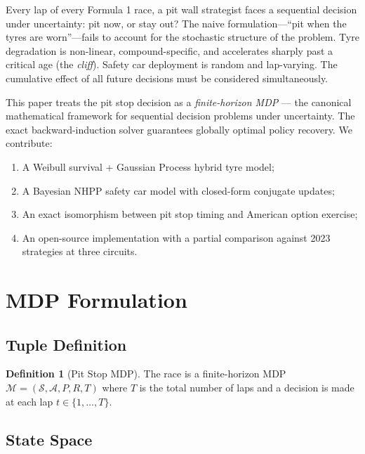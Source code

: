\documentclass[11pt, a4paper, twocolumn]{article}
\numberwithin{equation}{section}
\theoremstyle{definition}
\newtheorem{definition}{Definition}[section]
\newcommand{\mdp}{\mathcal{M}}
\newcommand{\states}{\mathcal{S}}
\newcommand{\actions}{\mathcal{A}}
\newcommand{\lap}{t}
\newcommand{\horizon}{T}
\begin{document}
Every lap of every Formula 1 race, a pit wall strategist faces a sequential
decision under uncertainty: pit now, or stay out? The naive formulation---``pit
when the tyres are worn''---fails to account for the stochastic structure of
the problem. Tyre degradation is non-linear, compound-specific, and accelerates
sharply past a critical age (the \emph{cliff}). Safety car deployment is random
and lap-varying. The cumulative effect of all future decisions must be
considered simultaneously.

This paper treats the pit stop decision as a \emph{finite-horizon MDP} ---
the canonical mathematical framework for sequential decision problems under
uncertainty. The exact backward-induction solver guarantees globally optimal
policy recovery. We contribute:
\begin{enumerate}[leftmargin=*, itemsep=1pt, topsep=2pt]
  \item A Weibull survival + Gaussian Process hybrid tyre model;
  \item A Bayesian NHPP safety car model with closed-form conjugate updates;
  \item An exact isomorphism between pit stop timing and American option exercise;
  \item An open-source implementation with a partial comparison against 2023 strategies at three circuits.
\end{enumerate}

\section{MDP Formulation}

\subsection{Tuple Definition}

\begin{definition}[Pit Stop MDP]
The race is a finite-horizon MDP $\mdp = (\states, \actions, P, R, \horizon)$
where $\horizon$ is the total number of laps and a decision is made at each
lap $\lap \in \{1, \ldots, \horizon\}$.
\end{definition}

\subsection{State Space}
\end{document}
